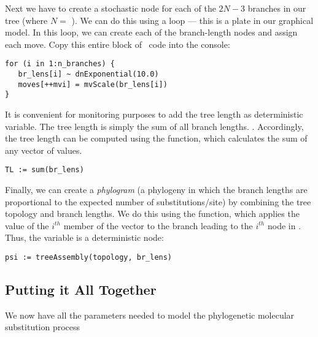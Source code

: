 Next we have to create a stochastic node for each of the $2N-3$ branches in our tree (where $N=$ ). 
We can do this using a  loop --- this is a plate in our graphical model. In this loop, we can create each of the branch-length nodes and assign each move. 
Copy this entire block of \Rev~code into the console:
{\tt \small \begin{snugshade*}
\begin{lstlisting}
for (i in 1:n_branches) {
   br_lens[i] ~ dnExponential(10.0)
   moves[++mvi] = mvScale(br_lens[i]) 
}
\end{lstlisting}
\end{snugshade*}}

It is convenient for monitoring purposes to add the tree length as deterministic variable. 
The tree length is simply the sum of all branch lengths. .
Accordingly, the tree length can be computed using the  function, which calculates the sum of any vector of values.
{\tt \begin{snugshade*}
\begin{lstlisting}
TL := sum(br_lens)
\end{lstlisting}
\end{snugshade*}}


Finally, we can create a \emph{phylogram} (a phylogeny in which the branch lengths are proportional to the expected number of substitutions/site) by combining the tree topology and branch lengths.
We do this using the  function, which applies the value of the $i^{th}$ member of the  vector to the branch leading to the $i^{th}$ node in . 
Thus, the  variable is a deterministic node: 
{\tt \begin{snugshade*}
\begin{lstlisting}
psi := treeAssembly(topology, br_lens)
\end{lstlisting}
\end{snugshade*}}



\subsection{Putting it All Together}

We now have all the parameters needed to model the phylogenetic molecular substitution process


